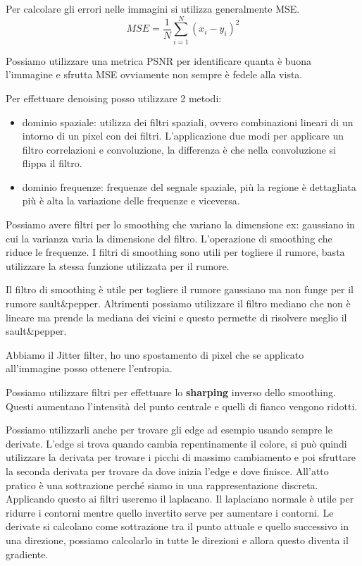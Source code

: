 Per calcolare gli errori nelle immagini si utilizza generalmente MSE.
$$MSE=\frac{1}{N}\sum_{i=1}^{N}(x_i-y_i)^2$$

Possiamo utilizzare una metrica PSNR per identificare quanta è buona l'immagine
e sfrutta MSE ovviamente non sempre è fedele alla vista.

Per effettuare denoising posso utilizzare 2 metodi:
\begin{itemize}
    \item dominio spaziale: utilizza dei filtri spaziali, ovvero combinazioni 
    lineari di un intorno di un pixel con dei filtri. L'applicazione due modi 
    per applicare un filtro correlazioni e convoluzione, la differenza è che nella 
    convoluzione si flippa il filtro.

    \item dominio frequenze: frequenze del segnale spaziale, più la regione è 
    dettagliata più è alta la variazione delle frequenze e viceversa.
\end{itemize}

Possiamo avere filtri per lo smoothing che variano la dimensione ex: gaussiano in cui
la varianza varia la dimensione del filtro. L'operazione di smoothing che riduce 
le frequenze. I filtri di smoothing sono utili per togliere il rumore, basta utilizzare 
la stessa funzione utilizzata per il rumore.

Il filtro di smoothing è utile per togliere il rumore gaussiano ma non funge per il 
rumore sault\&pepper. 
Altrimenti possiamo utilizzare il filtro mediano che non è lineare ma prende la mediana 
dei vicini e questo permette di risolvere meglio il sault\&pepper.

Abbiamo il Jitter filter, ho uno spostamento di pixel che se applicato all'immagine posso 
ottenere l'entropia.

Possiamo utilizzare filtri per effettuare lo \textbf{sharping} inverso dello smoothing.
Questi aumentano l'intensità del punto centrale e quelli di fianco vengono ridotti.

Possiamo utilizzarli anche per trovare gli edge ad esempio usando sempre le derivate.
L'edge si trova quando cambia repentinamente il colore, si può quindi utilizzare 
la derivata per trovare i picchi di massimo cambiamento e poi sfruttare la seconda 
derivata per trovare da dove inizia l'edge e dove finisce. All'atto pratico è una 
sottrazione perché siamo in una rappresentazione discreta. Applicando questo ai 
filtri useremo il laplacano. Il laplaciano normale è utile per ridurre i contorni 
mentre quello invertito serve per aumentare i contorni. Le derivate si calcolano 
come sottrazione tra il punto attuale e quello successivo in una direzione, possiamo 
calcolarlo in tutte le direzioni e allora questo diventa il gradiente. 